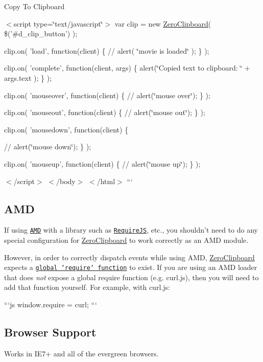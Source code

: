 Copy To Clipboard

$<$script type=\char`\"{}text/javascript\char`\"{}$>$ var clip = new \hyperlink{class_zero_clipboard}{Zero\-Clipboard}( \$('\#d\-\_\-clip\-\_\-button') );

clip.\-on( 'load', function(client) \{ // alert( \char`\"{}movie is loaded\char`\"{} ); \} );

clip.\-on( 'complete', function(client, args) \{ alert(\char`\"{}\-Copied text to clipboard\-: \char`\"{} + args.\-text ); \} );

clip.\-on( 'mouseover', function(client) \{ // alert(\char`\"{}mouse over\char`\"{}); \} );

clip.\-on( 'mouseout', function(client) \{ // alert(\char`\"{}mouse out\char`\"{}); \} );

clip.\-on( 'mousedown', function(client) \{

// alert(\char`\"{}mouse down\char`\"{}); \} );

clip.\-on( 'mouseup', function(client) \{ // alert(\char`\"{}mouse up\char`\"{}); \} );

$<$/script$>$ $<$/body$>$ $<$/html$>$ ```

\subsection*{A\-M\-D}

If using \href{https://github.com/amdjs/amdjs-api/wiki/AMD}{\tt A\-M\-D} with a library such as \href{http://requirejs.org/}{\tt Require\-J\-S}, etc., you shouldn't need to do any special configuration for \hyperlink{class_zero_clipboard}{Zero\-Clipboard} to work correctly as an A\-M\-D module.

However, in order to correctly dispatch events while using A\-M\-D, \hyperlink{class_zero_clipboard}{Zero\-Clipboard} expects a \href{https://github.com/amdjs/amdjs-api/wiki/require}{\tt global `require` function} to exist. If you are using an A\-M\-D loader that does {\itshape not} expose a global {\ttfamily require} function (e.\-g. curl.\-js), then you will need to add that function yourself. For example, with curl.\-js\-:

```js window.\-require = curl; ```

\subsection*{Browser Support}

Works in I\-E7+ and all of the evergreen browsers.

